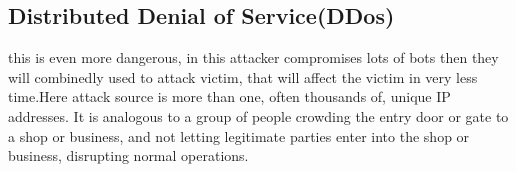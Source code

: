 \documentclass[11pt]{article}
\begin{document}
\subsection{Distributed Denial of Service(DDos)}
this is even more dangerous, in this attacker compromises lots of bots then they will combinedly used to attack victim, that will affect the victim in very less time.Here attack source is more than one, often thousands of, unique IP addresses. It is analogous to a group of people crowding the entry door or gate to a shop or business, and not letting legitimate parties enter into the shop or business, disrupting normal operations.
\end{document}
